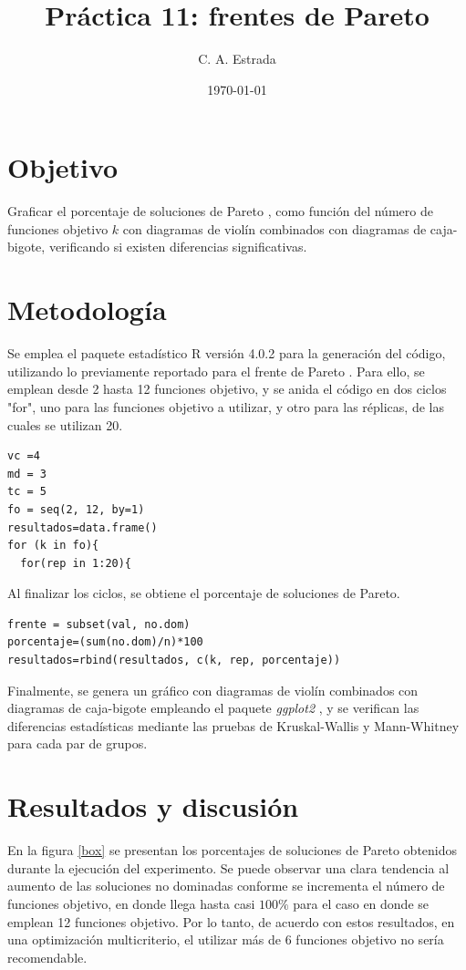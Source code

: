 \documentclass{article}
\title{\bf Práctica 11: frentes de Pareto}
\date{\today}
\author{C. A. Estrada}
\begin{document}
\maketitle

\section{Objetivo}
Graficar el porcentaje de soluciones de Pareto \cite{dra}, como función del número de funciones objetivo $k$ con diagramas de violín combinados con diagramas de caja-bigote, verificando si existen diferencias significativas.

\section{Metodología}
Se emplea el paquete estadístico R versión 4.0.2 \cite{R} para la generación del código, utilizando lo previamente reportado para el frente de Pareto \cite{dra}. Para ello, se emplean desde 2 hasta 12 funciones objetivo, y se anida el código en dos ciclos "for", uno para las funciones objetivo a utilizar, y otro para las réplicas, de las cuales se utilizan 20.
\begin{lstlisting}
vc =4
md = 3
tc = 5
fo = seq(2, 12, by=1) 
resultados=data.frame()
for (k in fo){
  for(rep in 1:20){
\end{lstlisting}
Al finalizar los ciclos, se obtiene el porcentaje de soluciones de Pareto.
\begin{lstlisting}
frente = subset(val, no.dom) 
porcentaje=(sum(no.dom)/n)*100 
resultados=rbind(resultados, c(k, rep, porcentaje))
\end{lstlisting}

Finalmente, se genera un gráfico con diagramas de violín combinados con diagramas de caja-bigote empleando el paquete \textit{ggplot2} \cite{gg}, y se verifican las diferencias estadísticas mediante las pruebas de Kruskal-Wallis y Mann-Whitney para cada par de grupos.

\section{Resultados y discusión}
En la figura \ref{box} se presentan los porcentajes de soluciones de Pareto obtenidos durante la ejecución del experimento. Se puede observar una clara tendencia al aumento de las soluciones no dominadas conforme se incrementa el número de funciones objetivo, en donde llega hasta casi $100\%$ para el caso en donde se emplean 12 funciones objetivo. Por lo tanto, de acuerdo con estos resultados, en una optimización multicriterio, el utilizar más de 6 funciones objetivo no sería recomendable.
\end{document}
